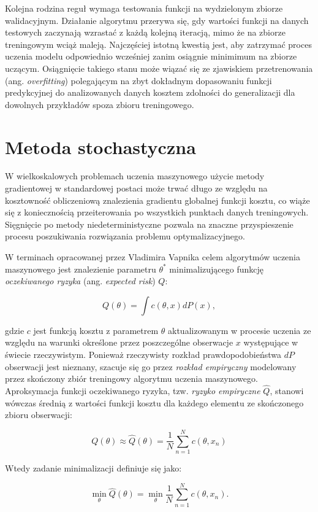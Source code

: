 \documentclass{pracamgr}
\begin{document}
Kolejna rodzina reguł wymaga testowania funkcji na wydzielonym zbiorze walidacyjnym. Działanie algorytmu przerywa się, gdy wartości funkcji na danych testowych zaczynają wzrastać z każdą kolejną iteracją, mimo że na zbiorze treningowym wciąż maleją. Najczęściej istotną kwestią jest, aby zatrzymać proces uczenia modelu odpowiednio wcześniej zanim osiągnie minimimum na zbiorze uczącym. Osiągnięcie takiego stanu może wiązać się ze zjawiskiem przetrenowania (ang. \textit{overfitting}) polegającym na zbyt dokładnym dopasowaniu funkcji predykcyjnej do analizowanych danych kosztem zdolności do generalizacji dla dowolnych przykładów spoza zbioru treningowego.

\section{Metoda stochastyczna}
W wielkoskalowych problemach uczenia maszynowego użycie metody gradientowej w standardowej postaci może trwać długo ze względu na kosztowność obliczeniową znalezienia gradientu globalnej funkcji kosztu, co wiąże się z koniecznością przeiterowania po wszystkich punktach danych treningowych. Sięgnięcie po metody niedeterministyczne pozwala na znaczne przyspieszenie procesu poszukiwania rozwiązania problemu optymalizacyjnego.

W terminach  opracowanej przez Vladimira Vapnika celem algorytmów uczenia maszynowego jest znalezienie parametru $\theta^{\ast}$ minimalizującego funkcję \textit{oczekiwanego ryzyka} (ang. \textit{expected risk}) $Q$:

\[
Q(\theta) = \int c(\theta, x)dP(x),
\]

gdzie $c$ jest funkcją kosztu z parametrem $\theta$ aktualizowanym w procesie uczenia ze względu na warunki określone przez poszczególne obserwacje $x$ występujące w świecie rzeczywistym. Ponieważ rzeczywisty rozkład prawdopodobieństwa $dP$ obserwacji jest nieznany, szacuje się go przez \textit{rozkład empiryczny} modelowany przez skończony zbiór treningowy algorytmu uczenia maszynowego. Aproksymacja funkcji oczekiwanego ryzyka, tzw. \textit{ryzyko empiryczne} $\hat{Q}$, stanowi wówczas średnią z wartości funkcji kosztu dla każdego elementu ze skończonego zbioru obserwacji:

\[
Q(\theta) \approx \hat{Q}(\theta) = \frac{1}{N} \sum_{n = 1}^{N} c(\theta, x_n)
\]

Wtedy zadanie minimalizacji definiuje się jako:

\[
\min_{\theta} \hat{Q}(\theta) = \min_{\theta} \frac{1}{N} \sum_{n = 1}^{N} c(\theta, x_n).
\]
\end{document}
